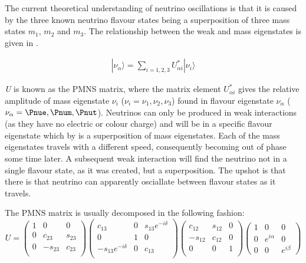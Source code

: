 
The current theoretical understanding of neutrino oscillations is that it is caused by the three known neutrino flavour states being a superposition of three mass states \textit{$m_{1}$}, \textit{$m_{2}$} and \textit{$m_{3}$}. The relationship between the weak and mass eigenstates is given in .

\begin{gather}
  |\nu_{\alpha}\rangle = \sum\limits_{i=1,2,3}U_{\alpha i}^{*}|\nu_{i}\rangle
  \label{eq:particle-physics:neutrino-flavour-mass-relation}
\end{gather}


\textit{U} is known as the PMNS matrix, where the matrix element $U_{\alpha i}^{*}$ gives the relative amplitude of mass eigenstate $\nu_{i}$ ($\nu_{i}=\nu_{1},\nu_{2},\nu_{3}$) found in flavour eigenstate $\nu_{\alpha}$ ($\nu_{\alpha}=\Pnue,\Pnum,\Pnut$). Neutrinos can only be produced in weak interactions (as they have no electric or colour charge) and will be in a specific flavour eigenstate which by  is a superposition of mass eigenstates. Each of the mass eigenstates travels with a different speed, consequently becoming out of phase some time later. A subsequent weak interaction will find the neutrino not in a single flavour state, as it was created, but a superposition. The upshot is that there is that neutrino can apparently osciallate between flavour states as it travels. 

The PMNS matrix is usually decomposed in the following fashion:
\begin{equation}
  U = 
  \begin{pmatrix}
    1 & 0 & 0 \\
    0 & c_{23} & s_{23} \\
    0 & -s_{23} & c_{23} \\
  \end{pmatrix}
  \begin{pmatrix}
    c_{13} & 0 & s_{13}e^{-i\delta} \\
    0 & 1 & 0 \\
    -s_{13}e^{-i\delta} & 0 & c_{13} \\
  \end{pmatrix}
  \begin{pmatrix}
    c_{12} & s_{12} & 0 \\
    -s_{12} & c_{12} & 0 \\
    0 & 0 & 1 \\
  \end{pmatrix}
  \begin{pmatrix}
    1 & 0 & 0 \\
    0 & e^{i\alpha} & 0 \\
    0 & 0 & e^{i\beta} 
  \end{pmatrix}
  \label{eq:particle-physics:pmns_matrix}
\end{equation}

